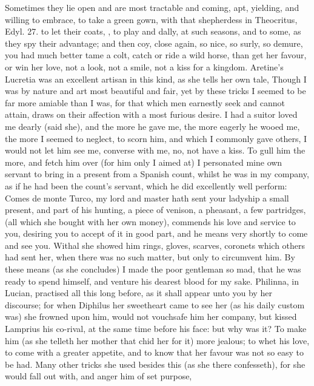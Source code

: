 {Sometimes they lie open and are most tractable and coming, apt,
yielding, and willing to embrace, to take a green gown, with that
shepherdess in Theocritus, Edyl. 27. to let their coats, \etc{}, to play
and dally, at such seasons, and to some, as they spy their advantage;
and then coy, close again, so nice, so surly, so demure, you had much
better tame a colt, catch or ride a wild horse, than get her favour, or
win her love, not a look, not a smile, not a kiss for a kingdom.
Aretine's Lucretia was an excellent artisan in this kind, as she
tells her own tale, Though I was by nature and art most beautiful and
fair, yet by these tricks I seemed to be far more amiable than I was,
for that which men earnestly seek and cannot attain, draws on their
affection with a most furious desire. I had a suitor loved me dearly
(said she), and the more he gave me, the more eagerly he wooed
me, the more I seemed to neglect, to scorn him, and which I commonly
gave others, I would not let him see me, converse with me, no, not have
a kiss. To gull him the more, and fetch him over (for him only I aimed
at) I personated mine own servant to bring in a present from a Spanish
count, whilst he was in my company, as if he had been the count's
servant, which he did excellently well perform: Comes de monte
Turco, my lord and master hath sent your ladyship a small present, and
part of his hunting, a piece of venison, a pheasant, a few partridges,
 \etc{} (all which she bought with her own money), commends his love and
service to you, desiring you to accept of it in good part, and he means
very shortly to come and see you. Withal she showed him rings, gloves,
scarves, coronets which others had sent her, when there was no such
matter, but only to circumvent him. By these means (as she
concludes) I made the poor gentleman so mad, that he was ready to spend
himself, and venture his dearest blood for my sake. Philinna, in
Lucian, practised all this long before, as it shall appear unto
you by her discourse; for when Diphilus her sweetheart came to see her
(as his daily custom was) she frowned upon him, would not vouchsafe him
her company, but kissed Lamprius his co-rival, at the same time
before his face: but why was it? To make him (as she telleth her
mother that chid her for it) more jealous; to whet his love, to come
with a greater appetite, and to know that her favour was not so easy to
be had. Many other tricks she used besides this (as she there
confesseth), for she would fall out with, and anger him of set purpose,
}
